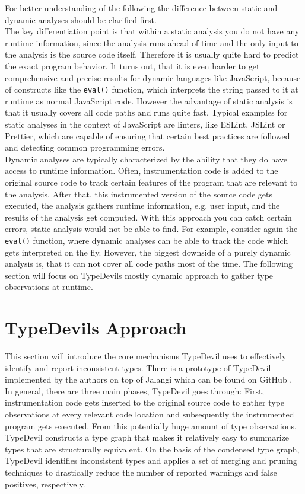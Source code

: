 \documentclass[runningheads,a4paper]{llncs}
\begin{document}
For better understanding of the following the difference between static and dynamic analyses should be clarified first.\\
The key differentiation point is that within a static analysis you do not have any runtime information, since the analysis runs ahead of time and the only input to the analysis is the source code itself.
Therefore it is usually quite hard to predict the exact program behavior.
It turns out, that it is even harder to get comprehensive and precise results for dynamic languages like JavaScript, because of constructs like the \lstinline[columns=fixed]{eval()} function, which interprets the string passed to it at runtime as normal JavaScript code. 
However the advantage of static analysis is that it usually covers all code paths and runs quite fast.
Typical examples for static analyses in the context of JavaScript are linters, like ESLint, JSLint or Prettier, which are capable of ensuring that certain best practices are followed and detecting common programming errors. \\
Dynamic analyses are typically characterized by the ability that they do have access to runtime information.
Often, instrumentation code is added to the original source code to track certain features of the program that are relevant to the analysis.
After that, this instrumented version of the source code gets executed, the analysis gathers runtime information, e.g. user input, and the results of the analysis get computed.
With this approach you can catch certain errors, static analysis would not be able to find.
For example, consider again the \lstinline[columns=fixed]{eval()} function, where dynamic analyses can be able to track the code which gets interpreted on the fly.
However, the biggest downside of a purely dynamic analysis is, that it can not cover all code paths most of the time.
The following section will focus on TypeDevils mostly dynamic approach to gather type observations at runtime.

\section{TypeDevils Approach}

This section will introduce the core mechanisms TypeDevil uses to effectively identify and report inconsistent types.
There is a prototype of TypeDevil implemented by the authors on top of Jalangi \cite{DBLP:conf/sigsoft/SenKBG13a} which can be found on GitHub \cite{TypeDevilGitHub}.\\
In general, there are three main phases, TypeDevil goes through: 
First, instrumentation code gets inserted to the original source code to gather type observations at every relevant code location and subsequently the instrumented program gets executed.
From this potentially huge amount of type observations, TypeDevil constructs a type graph that makes it relatively easy to summarize types that are structurally equivalent.
On the basis of the condensed type graph, TypeDevil identifies inconsistent types and applies a set of merging and pruning techniques to drastically reduce the number of reported warnings and false positives, respectively.
\end{document}

